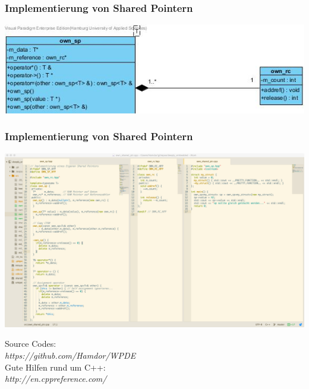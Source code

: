 \documentclass{beamer}
\begin{document}
\begin{frame}
 \frametitle{Implementierung von Shared Pointern}
 \includegraphics[scale=.6]{own_sp_classdiagram}
\end{frame}

\begin{frame}
 \frametitle{Implementierung von Shared Pointern}
 \includegraphics[scale=.2]{own_sp.png}
\end{frame}

\begin{frame}
\center
Source Codes:\\
\textit{https://github.com/Hamdor/WPDE}\\
Gute Hilfen rund um C++:\\
\textit{http://en.cppreference.com/}
\end{frame}
\end{document}
